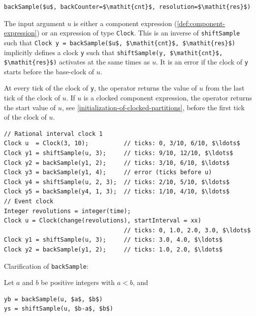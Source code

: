\begin{operatordefinition}[backSample]
\begin{synopsis}\begin{lstlisting}
backSample($u$, backCounter=$\mathit{cnt}$, resolution=$\mathit{res}$)
\end{lstlisting}\end{synopsis}
\begin{semantics}
The input argument $u$ is either a component expression (\cref{def:component-expression}) or an expression of type \lstinline!Clock!.
This is an inverse of \lstinline!shiftSample! such that \lstinline!Clock y = backSample($u$, $\mathit{cnt}$, $\mathit{res}$)! implicitly defines a clock \lstinline!y! such that \lstinline!shiftSample(y, $\mathit{cnt}$, $\mathit{res}$)! activates at the same times as $u$.
It is an error if the clock of \lstinline!y! starts before the base-clock of $u$.

At every tick of the clock of \lstinline!y!, the operator returns the value of $u$ from the last tick of the clock of $u$.
If $u$ is a clocked component expression, the operator returns the start value of $u$, see \cref{initialization-of-clocked-partitions}, before the first tick of the clock of $u$.

\begin{example}
\begin{lstlisting}[language=modelica]
// Rational interval clock 1
Clock u  = Clock(3, 10);          // ticks: 0, 3/10, 6/10, $\ldots$
Clock y1 = shiftSample(u, 3);     // ticks: 9/10, 12/10, $\ldots$
Clock y2 = backSample(y1, 2);     // ticks: 3/10, 6/10, $\ldots$
Clock y3 = backSample(y1, 4);     // error (ticks before u)
Clock y4 = shiftSample(u, 2, 3);  // ticks: 2/10, 5/10, $\ldots$
Clock y5 = backSample(y4, 1, 3);  // ticks: 1/10, 4/10, $\ldots$
// Event clock
Integer revolutions = integer(time);
Clock u = Clock(change(revolutions), startInterval = xx)
                                  // ticks: 0, 1.0, 2.0, 3.0, $\ldots$
Clock y1 = shiftSample(u, 3);     // ticks: 3.0, 4.0, $\ldots$
Clock y2 = backSample(y1, 2);     // ticks: 1.0, 2.0, $\ldots$
\end{lstlisting}
\end{example}
\end{semantics}

\begin{nonnormative}
Clarification of \lstinline!backSample!:

Let $a$ and $b$ be positive integers with $a < b$, and
\begin{lstlisting}[language=modelica]
yb = backSample(u, $a$, $b$)
ys = shiftSample(u, $b-a$, $b$)
\end{lstlisting}


\end{nonnormative}
\end{operatordefinition}
